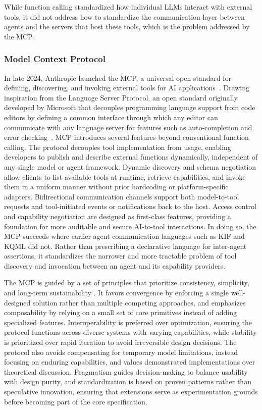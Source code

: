 \documentclass[
english,                 %
bibtex,                  %
]{kththesis}
\numberwithin{listing}{chapter}
\begin{document}
While function calling standardized how individual \glspl{LLM} interact with external tools, it did not address how to standardize the communication layer between agents and the servers that host these tools, which is the problem addressed by the \gls{MCP}.

\subsubsection{Model Context Protocol}
\label{sec:bg_model_context_protocol}

In late 2024, Anthropic launched the \gls{MCP}, a universal open standard for defining, discovering, and invoking external tools for \gls{AI} applications~\cite{hou_model_2026}. Drawing inspiration from the Language Server Protocol, an open standard originally developed by Microsoft that decouples programming language support from code editors by defining a common interface through which any editor can communicate with any language server for features such as auto-completion and error checking~\cite{gunasinghe_language_2021}, \gls{MCP} introduces several features beyond conventional function calling. The protocol decouples tool implementation from usage, enabling developers to publish and describe external functions dynamically, independent of any single model or agent framework. Dynamic discovery and schema negotiation allow clients to list available tools at runtime, retrieve capabilities, and invoke them in a uniform manner without prior hardcoding or platform-specific adapters. Bidirectional communication channels support both model-to-tool requests and tool-initiated events or notifications back to the host. Access control and capability negotiation are designed as first-class features, providing a foundation for more auditable and secure \gls{AI}-to-tool interactions. In doing so, the \gls{MCP} succeeds where earlier agent communication languages such as \gls{KIF} and \gls{KQML} did not. Rather than prescribing a declarative language for inter-agent assertions, it standardizes the narrower and more tractable problem of tool discovery and invocation between an agent and its capability providers.

The \gls{MCP} is guided by a set of principles that prioritize consistency, simplicity, and long-term sustainability \cite{delimarsky_mcp_2026, soria_parra_design_2026}. It favors convergence by enforcing a single well-designed solution rather than multiple competing approaches, and emphasizes composability by relying on a small set of core primitives instead of adding specialized features. Interoperability is preferred over optimization, ensuring the protocol functions across diverse systems with varying capabilities, while stability is prioritized over rapid iteration to avoid irreversible design decisions. The protocol also avoids compensating for temporary model limitations, instead focusing on enduring capabilities, and values demonstrated implementations over theoretical discussion. Pragmatism guides decision-making to balance usability with design purity, and standardization is based on proven patterns rather than speculative innovation, ensuring that extensions serve as experimentation grounds before becoming part of the core specification.
\end{document}
